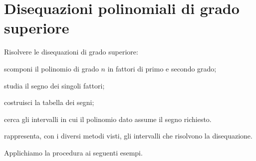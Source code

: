 %  
% 
% 


\section{Disequazioni polinomiali di grado superiore}
\label{sec:diseq_grado_superiore}

\begin{procedura}
Risolvere le disequazioni di grado superiore:
\begin{enumeratea}
\item scomponi il polinomio di grado $n$ in fattori di primo e secondo grado;
\item studia il segno dei singoli fattori;
\item costruisci la tabella dei segni;
\item cerca gli intervalli in cui il polinomio dato assume il segno richiesto.
\item rappresenta, con i diversi metodi visti, gli intervalli che 
 risolvono la disequazione.
\end{enumeratea}
\end{procedura}

Applichiamo la procedura ai seguenti esempi.

